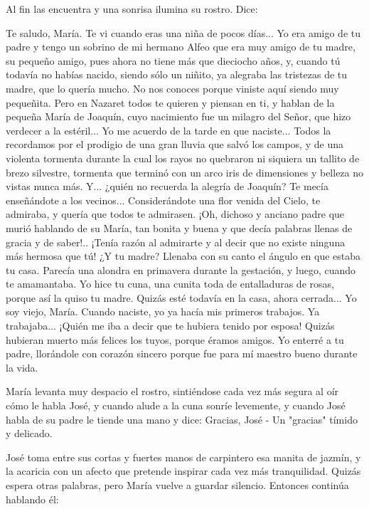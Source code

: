 \documentclass[12pt]{book} %
\begin{document}
Al fin las encuentra y una sonrisa ilumina su rostro. Dice: 

Te saludo, María. Te vi cuando eras una niña de pocos días... Yo era amigo de tu padre y tengo un sobrino de mi hermano Alfeo que era muy amigo de tu madre, su pequeño amigo, pues ahora no tiene más que dieciocho años, y, cuando tú todavía no habías nacido, siendo sólo un niñito, ya alegraba las tristezas de tu madre, que lo quería mucho. No nos conoces porque viniste aquí siendo muy pequeñita. Pero en Nazaret todos te quieren y piensan en ti, y hablan de la pequeña María de Joaquín, cuyo nacimiento fue un milagro del Señor, que hizo verdecer a la estéril... Yo me acuerdo de la tarde en que naciste... Todos la recordamos por el prodigio de una gran lluvia que salvó los campos, y de una violenta tormenta durante la cual los rayos no quebraron ni siquiera un tallito de brezo silvestre, tormenta que terminó con un arco iris de dimensiones y belleza no vistas nunca más. Y... ¿quién no recuerda la alegría de Joaquín? Te mecía enseñándote a los vecinos... Considerándote una flor venida del Cielo, te admiraba, y quería que todos te admirasen. ¡Oh, dichoso y anciano padre que murió hablando de su María, tan bonita y buena y que decía palabras llenas de gracia y de saber!.. ¡Tenía razón al admirarte y al decir que no existe ninguna más hermosa que tú! ¿Y tu madre? Llenaba con su canto el ángulo en que estaba tu casa. Parecía una alondra en primavera durante la gestación, y luego, cuando te amamantaba. Yo hice tu cuna, una cunita toda de entalladuras de rosas, porque así la quiso tu madre. Quizás esté todavía en la casa, ahora cerrada... Yo soy viejo, María. Cuando naciste, yo ya hacía mis primeros trabajos. Ya trabajaba... ¡Quién me iba a decir que te hubiera tenido por esposa! Quizás hubieran muerto más felices los tuyos, porque éramos amigos. Yo enterré a tu padre, llorándole con corazón sincero porque fue para mí maestro bueno durante la vida. 

María levanta muy despacio el rostro, sintiéndose cada vez más segura al oír cómo le habla José, y cuando alude a la cuna sonríe levemente, y cuando José habla de su padre le tiende una mano y dice: Gracias, José - Un "gracias" tímido y delicado. 

José toma entre sus cortas y fuertes manos de carpintero esa manita de jazmín, y la acaricia con un afecto que pretende inspirar cada vez más tranquilidad. Quizás espera otras palabras, pero María vuelve a guardar silencio. Entonces continúa hablando él: 
\end{document}

